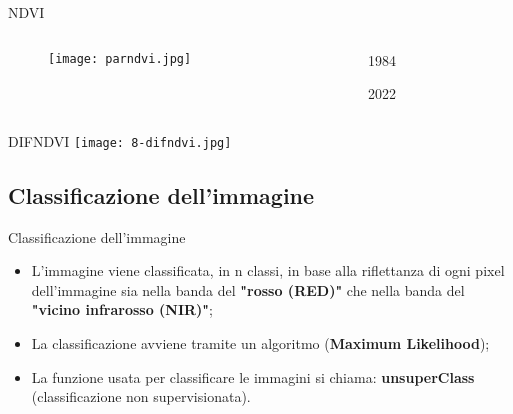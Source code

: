 \documentclass{beamer}
\begin{document}
\begin{frame}{NDVI}
    \begin{columns}
    \begin{column}{0.6\textwidth}
    \begin{figure}
        \centering
        \texttt{[image: parndvi.jpg]}
    \end{figure}
    \end{column}
    \begin{column}{0.1\textwidth}

    1984 
     
     \bigskip
     
     \bigskip
     
     \bigskip
     
     \bigskip
     
     \bigskip
     
     \bigskip
     
     \bigskip
     
     \bigskip
     
     \bigskip
     
     \bigskip
     
    2022

    \end{column}
    \end{columns}
\end{frame}

\begin{frame}{DIFNDVI}
    \texttt{[image: 8-difndvi.jpg]}
    \centering
\end{frame}


\subsection{Classificazione dell'immagine}

\begin{frame}{Classificazione dell'immagine}
\begin{itemize}
    \item L'immagine viene classificata, in n classi, in base alla riflettanza di ogni pixel dell'immagine sia nella banda del \textbf{"rosso (RED)"} che nella banda del \textbf{"vicino infrarosso (NIR)"};
    
    \bigskip
    
    \item \pause La classificazione avviene tramite un algoritmo (\textbf{Maximum Likelihood});
    
    \bigskip
    
    \item \pause La funzione usata per classificare le immagini si chiama:  \textbf{unsuperClass} (classificazione non supervisionata).
\end{itemize}
\end{frame}
\end{document}
